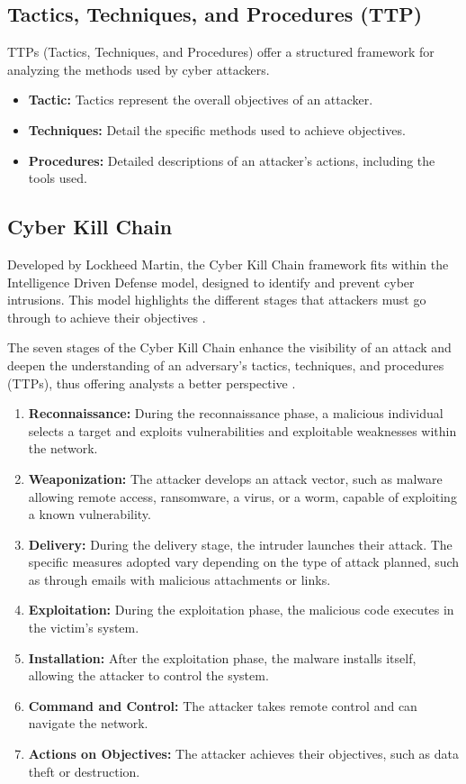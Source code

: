\subsection{Tactics, Techniques, and Procedures (TTP)}
\label{subsec:ttp}

TTPs (Tactics, Techniques, and Procedures) offer a structured framework for analyzing the methods used by cyber attackers.

\begin{itemize}
    \item \textbf{Tactic:} Tactics represent the overall objectives of an attacker.
    \item \textbf{Techniques:} Detail the specific methods used to achieve objectives.
    \item \textbf{Procedures:} Detailed descriptions of an attacker's actions, including the tools used.
\end{itemize}

\subsection{Cyber Kill Chain}
\label{subsec:killchain}

Developed by Lockheed Martin, the Cyber Kill Chain framework fits within the Intelligence Driven Defense model, designed to identify and prevent cyber intrusions. This model highlights the different stages that attackers must go through to achieve their objectives \cite{ref18}.

The seven stages of the Cyber Kill Chain enhance the visibility of an attack and deepen the understanding of an adversary's tactics, techniques, and procedures (TTPs), thus offering analysts a better perspective \cite{ref18}.

\begin{enumerate}
    \item \textbf{Reconnaissance:} During the reconnaissance phase, a malicious individual selects a target and exploits vulnerabilities and exploitable weaknesses within the network.
    \item \textbf{Weaponization:} The attacker develops an attack vector, such as malware allowing remote access, ransomware, a virus, or a worm, capable of exploiting a known vulnerability.
    \item \textbf{Delivery:} During the delivery stage, the intruder launches their attack. The specific measures adopted vary depending on the type of attack planned, such as through emails with malicious attachments or links.
    \item \textbf{Exploitation:} During the exploitation phase, the malicious code executes in the victim's system.
    \item \textbf{Installation:} After the exploitation phase, the malware installs itself, allowing the attacker to control the system.
    \item \textbf{Command and Control:} The attacker takes remote control and can navigate the network.
    \item \textbf{Actions on Objectives:} The attacker achieves their objectives, such as data theft or destruction.
\end{enumerate}

